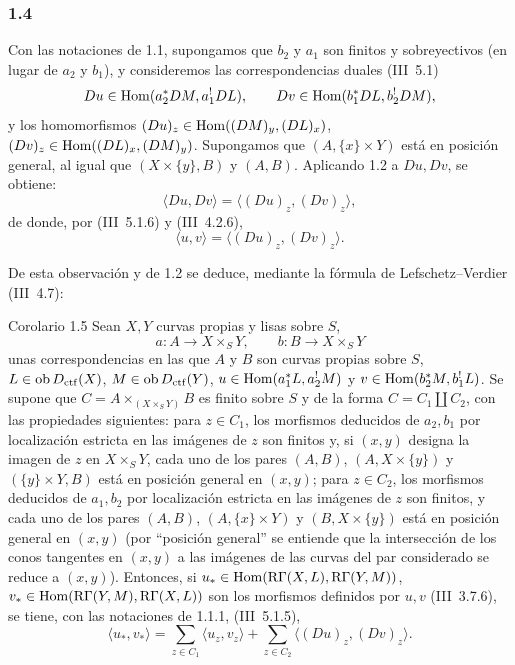 \subsubsection*{1.4}
Con las notaciones de 1.1, supongamos que $b_2$ y $a_1$ son finitos y sobreyectivos (en lugar de $a_2$ y $b_1$), y consideremos las correspondencias duales (III~5.1)
\[
Du\in\operatorname{Hom}(a_2^*DM,a_1^!DL),\qquad Dv\in\operatorname{Hom}(b_1^*DL,b_2^!DM),
\]
y los homomorfismos $(Du)_z\in\operatorname{Hom}((DM)_y,(DL)_x)$, $(Dv)_z\in\operatorname{Hom}((DL)_x,(DM)_y)$. Supongamos que $(A,\{x\}\times Y)$ está en posición general, al igual que $(X\times\{y\},B)$ y $(A,B)$. Aplicando 1.2 a $Du,Dv$, se obtiene:
\[
\langle Du,Dv\rangle=\langle (Du)_z,(Dv)_z\rangle,
\]
de donde, por (III~5.1.6) y (III~4.2.6),
\begin{equation}\tag{1.4.1}
\langle u,v\rangle=\langle (Du)_z,(Dv)_z\rangle.
\end{equation}

De esta observación y de 1.2 se deduce, mediante la fórmula de Lefschetz--Verdier (III~4.7):

\begin{statement}{Corolario 1.5}
Sean $X,Y$ curvas propias y lisas sobre $S$,
\[
a:A\longrightarrow X\times_S Y,
\qquad
b:B\longrightarrow X\times_S Y
\]
unas correspondencias en las que $A$ y $B$ son curvas propias sobre $S$, $L\in\operatorname{ob} D_{\mathrm{ctf}}(X)$, $M\in\operatorname{ob} D_{\mathrm{ctf}}(Y)$, $u\in\operatorname{Hom}(a_1^*L,a_2^!M)$ y $v\in\operatorname{Hom}(b_2^*M,b_1^!L)$. Se supone que $C=A\times_{(X\times_S Y)}B$ es finito sobre $S$ y de la forma $C=C_1\amalg C_2$, con las propiedades siguientes: para $z\in C_1$, los morfismos deducidos de $a_2,b_1$ por localización estricta en las imágenes de $z$ son finitos y, si $(x,y)$ designa la imagen de $z$ en $X\times_S Y$, cada uno de los pares $(A,B)$, $(A,X\times\{y\})$ y $(\{y\}\times Y,B)$ está en posición general en $(x,y)$; para $z\in C_2$, los morfismos deducidos de $a_1,b_2$ por localización estricta en las imágenes de $z$ son finitos, y cada uno de los pares $(A,B)$, $(A,\{x\}\times Y)$ y $(B,X\times\{y\})$ está en posición general en $(x,y)$ (por ``posición general'' se entiende que la intersección de los conos tangentes en $(x,y)$ a las imágenes de las curvas del par considerado se reduce a $(x,y)$). Entonces, si $u_*\in\operatorname{Hom}(\mathrm{R}\Gamma(X,L),\mathrm{R}\Gamma(Y,M))$, $v_*\in\operatorname{Hom}(\mathrm{R}\Gamma(Y,M),\mathrm{R}\Gamma(X,L))$ son los morfismos definidos por $u,v$ (III~3.7.6), se tiene, con las notaciones de 1.1.1, (III~5.1.5),
\begin{equation}\tag{1.5.1}
\langle u_*,v_*\rangle=\sum_{z\in C_1}\langle u_z,v_z\rangle+\sum_{z\in C_2}\langle (Du)_z,(Dv)_z\rangle.
\end{equation}
\end{statement}

